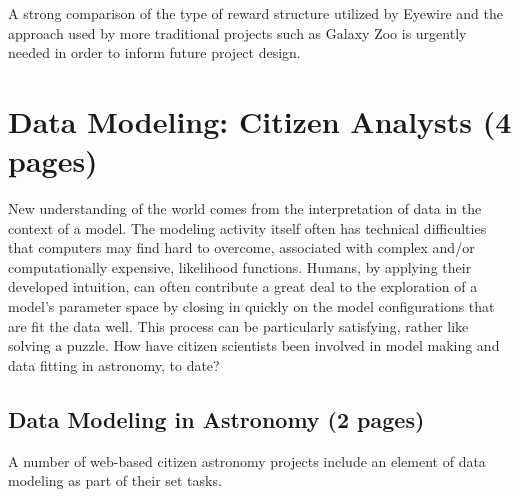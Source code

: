 \documentclass{ar2e}
\begin{document}

A strong comparison of the type of reward structure utilized by
Eyewire and the approach used by more traditional projects such as Galaxy Zoo
is urgently needed in order to inform future project design. 



\section{Data Modeling: Citizen Analysts (4 pages)}
\label{sec:model}

New understanding of the world comes from the interpretation of data in the
context of a model. The modeling activity itself often has technical
difficulties that computers may find hard to overcome, associated with complex
and/or computationally expensive, likelihood functions. Humans, by applying
their developed intuition, can often contribute a great deal to the
exploration of a model's parameter space by closing in quickly on the model
configurations that are fit the data well. This process can be particularly
satisfying, rather like solving a puzzle. How have citizen scientists been
involved in model making and data fitting in astronomy, to date?



\subsection{Data Modeling in Astronomy (2 pages)}
\label{sec:model:astro}

A number of  web-based citizen astronomy projects include an element of data
modeling as part of their set tasks. 

\end{document}
